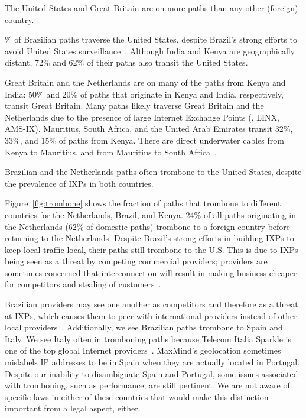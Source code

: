 \begin{finding}
The United States and Great Britain are on more paths than any other (foreign) country.
\end{finding}
\% of Brazilian paths traverse the United States, despite Brazil's
strong efforts to avoid United States surveillance~\cite{brazil_break_from_US,brazil_us_companies,brazil_conference,brazil_conference2,brazil_human_rights,brazil_cable}.  Although India and
Kenya are geographically distant, 72\% and 62\% of their paths also transit
the United States.

Great Britain and the Netherlands are on 
many of the paths from Kenya and India:
50\% and 20\% of
paths that originate in Kenya and India, respectively, transit Great
Britain.   Many paths likely traverse Great Britain and the Netherlands due to
the presence of large Internet Exchange Points (\ie, LINX, AMS-IX).
Mauritius, South Africa, and the United Arab Emirates transit 32\%,
33\%, and 15\% of paths from Kenya.  There are direct underwater cables
from Kenya to Mauritius, and from Mauritius to South
Africa~\cite{cablemap}.



\begin{finding}
Brazilian and the Netherlands paths often trombone to the United States, despite the prevalence of IXPs in both countries.
\end{finding}
\noindent
Figure~\ref{fig:trombone}
shows the fraction of paths that trombone to
different countries for the Netherlands, Brazil, and Kenya. 24\% of
all paths originating in the Netherlands (62\% of domestic paths)
trombone to a foreign country before returning to the
Netherlands. Despite Brazil's strong efforts in building IXPs to keep
local traffic local, 
their paths still trombone to the U.S.  This is due to IXPs being seen
as a threat by competing commercial providers; providers are sometimes
concerned that interconnection will result in making business
cheaper for competitors and stealing of customers~\cite{ixp_policy}.

Brazilian providers may see one another as competitors and therefore as a
threat at IXPs, which causes them to peer with international providers instead
of other local providers~\cite{ixp_policy}.  Additionally, we see Brazilian paths trombone to
Spain and Italy.  We see Italy often in tromboning paths because Telecom
Italia Sparkle is one of the top global Internet providers~\cite{bakers}. 
MaxMind's geolocation sometimes mislabels IP addresses to be in
Spain when they are actually located in Portugal.  Despite our inability to
disambiguate Spain and Portugal, some issues associated with tromboning,
such as performance, are still pertinent. We are not aware of specific laws in
either of these countries that would make this distinction important from a legal aspect, either.


